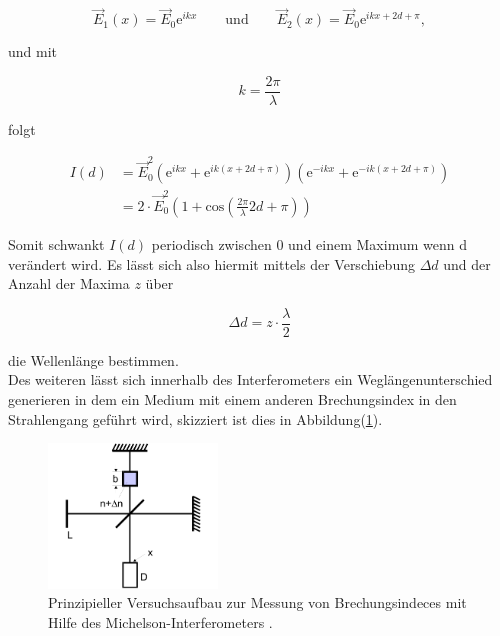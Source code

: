         \begin{equation}
            \vec{E}_1(x) = \vec{E}_0 \text{e}^{ikx} \quad \quad \text{und} \quad \quad \vec{E}_2(x) = \vec{E}_0 \text{e}^{ikx + 2d +\pi} ,    \nonumber 
        \end{equation}

        \noindent und mit 

        \begin{equation*}
            k = \frac{2 \pi}{\lambda}
        \end{equation*}

        \noindent folgt

        \begin{align}
            I(d) &= \vec{E}_0^2 \left( \text{e}^{ikx} + \text{e}^{ik(x + 2d + \pi)} \right) \left( \text{e}^{-ikx} + \text{e}^{-ik(x + 2d + \pi)} \right) \\    \nonumber 
                 &= 2 \cdot \vec{E}_0^2  \left( 1 + \text{cos} \left( \frac{2 \pi}{\lambda} 2 d + \pi \right) \right)    \nonumber 
        \end{align}

        \noindent Somit schwankt $I(d)$ periodisch zwischen 0 und einem Maximum wenn d verändert wird. Es lässt sich also hiermit mittels der 
        Verschiebung $\Delta d$ und der Anzahl der Maxima $z$ über 

        \begin{equation}
            \Delta d = z \cdot \frac{\lambda}{2}    \nonumber 
        \end{equation}

        \noindent die Wellenlänge bestimmen.\\

        Des weiteren lässt sich innerhalb des Interferometers ein Weglängenunterschied generieren in dem ein Medium mit einem anderen 
        Brechungsindex in den Strahlengang geführt wird, skizziert ist dies in Abbildung(\ref{img:5}).

        \begin{figure}[ht]
            \centering
            \includegraphics[width=0.4\textwidth]{latex/images/PrinOrd.PNG}
            \caption{Prinzipieller Versuchsaufbau zur Messung von Brechungsindeces mit Hilfe des Michelson-Interferometers \protect \cite{V401}.}
            \label{img:5}
        \end{figure}

